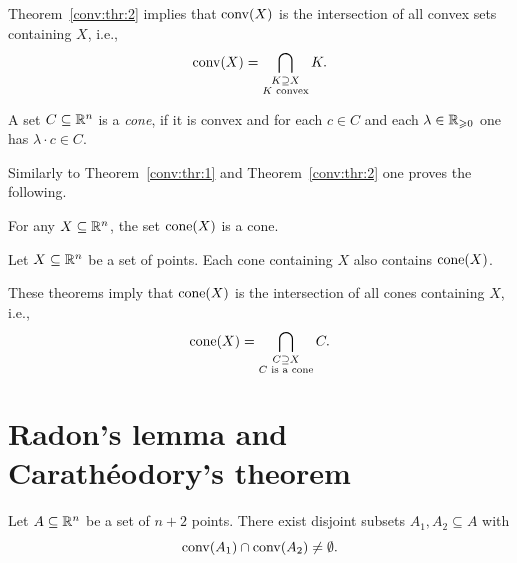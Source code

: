 Theorem~\ref{conv:thr:2} implies that $\operatorname{conv}(X)$ is the intersection of all
convex sets containing $X$, i.e., 
\begin{displaymath}
  \operatorname{conv}(X) = \bigcap_{\substack{K \supseteq X\\ K \text{  convex}}} K. 
\end{displaymath}



\begin{definition}
  \label{conv:def:4}
  A set $C\subseteq\mathbb{R}^n$ is a \emph{cone}, if it is convex and for each $c \in
  C$ and each $\lambda \in \mathbb{R}_{\geqslant0}$ one has  $\lambda\cdot c \in C$. 
\end{definition}

Similarly to Theorem~\ref{conv:thr:1} and Theorem~\ref{conv:thr:2} one proves
the following. 
\begin{theorem}
  \label{conv:thr:8}
  For any $X\subseteq\mathbb{R}^n$, the set $\mathrm{cone}(X)$ is a cone. 
\end{theorem}

\begin{theorem}
  \label{conv:thr:9}
  Let $X\subseteq\mathbb{R}^n$ be a set of points. Each cone containing $X$ also
  contains $\mathrm{cone}(X)$. 
\end{theorem}

These theorems imply that $\mathrm{cone}(X)$ is the intersection of all
cones  containing $X$, i.e., 
\begin{displaymath}
  \mathrm{cone}(X) = \bigcap_{\substack{C \supseteq X\\ C \text{  is a cone}}} C. 
\end{displaymath}


\section{Radon's lemma and Carath\'eodory's theorem}
\label{conv:sec:radons-lemma-carath}

\begin{theorem}
  \label{conv:thr:6}
  Let $A\subseteq\mathbb{R}^n$ be  a set of $n+2$ points. There exist disjoint
  subsets $A_1,A_2\subseteq A$ with
  \begin{displaymath}
    \operatorname{conv}(A_1) \cap \operatorname{conv}(A_2) \neq \emptyset.
  \end{displaymath}
\end{theorem}

